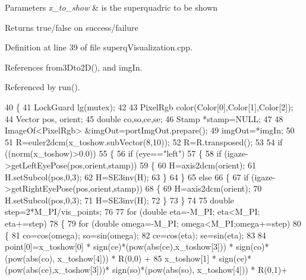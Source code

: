 \begin{DoxyParams}{Parameters}
{\em x\-\_\-to\-\_\-show} & is the superquadric to be shown \\
\hline
\end{DoxyParams}
\begin{DoxyReturn}{Returns}
true/false on success/failure 
\end{DoxyReturn}


Definition at line 39 of file superq\-Visualization.\-cpp.



References from3\-Dto2\-D(), and img\-In.



Referenced by run().


\begin{DoxyCode}
40 \{
41     LockGuard lg(mutex);
42 
43     PixelRgb color(Color[0],Color[1],Color[2]);
44     Vector pos, orient;
45     \textcolor{keywordtype}{double} co,so,ce,se;
46     Stamp *stamp=NULL;
47 
48     ImageOf<PixelRgb> &imgOut=portImgOut.prepare();
49     imgOut=*imgIn;
50 
51     R=euler2dcm(x\_toshow.subVector(8,10));
52     R=R.transposed();
53 
54     \textcolor{keywordflow}{if} ((norm(x\_toshow)>0.0))
55     \{
56         \textcolor{keywordflow}{if} (eye==\textcolor{stringliteral}{"left"})
57         \{
58             \textcolor{keywordflow}{if} (igaze->getLeftEyePose(pos,orient,stamp))
59             \{
60                 H=axis2dcm(orient);
61                 H.setSubcol(pos,0,3);
62                 H=SE3inv(H);
63             \}
64         \}
65         \textcolor{keywordflow}{else}
66         \{
67             \textcolor{keywordflow}{if} (igaze->getRightEyePose(pos,orient,stamp))
68             \{
69                 H=axis2dcm(orient);
70                 H.setSubcol(pos,0,3);
71                 H=SE3inv(H);
72             \}
73         \}
74 
75         \textcolor{keywordtype}{double} step=2*M\_PI/vis\_points;
76 
77         \textcolor{keywordflow}{for} (\textcolor{keywordtype}{double} eta=-M\_PI; eta<M\_PI; eta+=step)
78         \{
79              \textcolor{keywordflow}{for} (\textcolor{keywordtype}{double} omega=-M\_PI; omega<M\_PI;omega+=step)
80              \{
81                  co=cos(omega); so=sin(omega);
82                  ce=cos(eta); se=sin(eta);
83 
84                  point[0]=x\_toshow[0] * sign(ce)*(pow(abs(ce),x\_toshow[3])) * sign(co)*(pow(abs(co),
      x\_toshow[4])) * R(0,0) +
85                             x\_toshow[1] * sign(ce)*(pow(abs(ce),x\_toshow[3]))* sign(so)*(pow(abs(so),
      x\_toshow[4])) * R(0,1)+

\end{DoxyCode}
